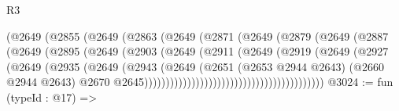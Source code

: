 \begin{lexlean}{R3}
\begin{coremodule}
                                    (@2649
                                      (@2855
                                        (@2649
                                          (@2863
                                            (@2649
                                              (@2871
                                                (@2649
                                                  (@2879
                                                    (@2649
                                                      (@2887
                                                        (@2649
                                                          (@2895
                                                            (@2649
                                                              (@2903
                                                                (@2649
                                                                  (@2911
                                                                    (@2649
                                                                      (@2919
                                                                        (@2649
                                                                          (@2927
                                                                            (@2649
                                                                              (@2935
                                                                                (@2649
                                                                                  (@2943
                                                                                    (@2649
                                                                                      (@2651
                                                                                        (@2653
                                                                                          @2944
                                                                                          @2643)
                                                                                        (@2660
                                                                                          @2944
                                                                                          @2643)
                                                                                        @2670
                                                                                        @2645))))))))))))))))))))))))))))))))))))))))))
@3024 := fun (typeId : @17) =>

\end{coremodule}
\end{lexlean}
